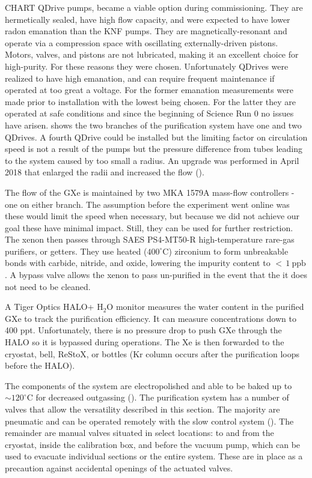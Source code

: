 CHART QDrive pumps, became a viable option during commissioning.  They are hermetically sealed, have high flow capacity, and were expected
to have lower radon emanation than the KNF pumps.  They are
magnetically-resonant and operate via a compression space with oscillating externally-driven pistons.  Motors, valves, and pistons are
not lubricated, making it an excellent choice for high-purity.  For these reasons they were chosen.  Unfortunately QDrives were realized
to have high  emanation, and can require frequent
maintenance if operated at too great a voltage.  For the former  emanation measurements were made prior to
installation with the lowest being chosen.  For the latter they are operated at safe conditions and since the beginning of Science Run 0
no issues have arisen.   shows the two branches of the purification system have one and two QDrives.  A
fourth QDrive could be installed but the limiting factor on circulation speed is not a result of the pumps but the pressure difference
from tubes leading to the system caused by too small a radius.  An upgrade was performed in April 2018 that enlarged the radii and
increased the flow ().

The flow of the GXe is maintained by two MKA 1579A mass-flow controllers - one on either branch.  The assumption before the experiment
went
online was these would limit the speed when necessary, but because we did not achieve our goal these have minimal impact.  Still, they can
be used for further restriction.  The xenon then passes through SAES PS4-MT50-R high-temperature rare-gas purifiers, or getters.  They
use heated ($400^{\circ}\mathrm{C}$) zirconium to form unbreakable bonds with carbide, nitride, and oxide, lowering the impurity content
to ${<}\, 1\ \mathrm{ppb}$ .  A bypass valve allows the xenon to pass un-purified in the event that the it does not
need to be cleaned.

A Tiger Optics HALO+ H$_2$O monitor measures the water content in the purified GXe to track the purification efficiency.  It can measure
concentrations down to 400 ppt.  Unfortunately, there is no pressure drop to push GXe through the HALO so it is bypassed during
operations.  The Xe is then forwarded to the cryostat, bell, ReStoX, or
bottles (Kr column occurs after the purification loops before the HALO).

The components of the system are electropolished and able to be baked up to ${\sim} 120^{\circ}\mathrm{C}$ for decreased outgassing
().  The purification system has a number of valves that allow the versatility described in this section.  The majority are
pneumatic and can
be operated remotely with the slow control system ().  The remainder are manual valves
situated in select locations: to and from the cryostat,
inside the calibration box, and before the vacuum pump, which can be used to evacuate individual sections or the entire system.  These are
in place as a precaution against accidental openings of the actuated valves.


